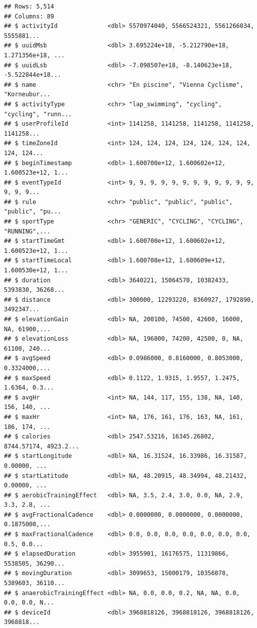 \documentclass[
]{book}
\begin{document}
\begin{verbatim}
## Rows: 5,514
## Columns: 89
## $ activityId              <dbl> 5570974040, 5566524321, 5561266034, 5555881...
## $ uuidMsb                 <dbl> 3.695224e+18, -5.212790e+18, 1.271356e+18, ...
## $ uuidLsb                 <dbl> -7.098507e+18, -8.140623e+18, -5.522844e+18...
## $ name                    <chr> "En piscine", "Vienna Cyclisme", "Korneubur...
## $ activityType            <chr> "lap_swimming", "cycling", "cycling", "runn...
## $ userProfileId           <int> 1141258, 1141258, 1141258, 1141258, 1141258...
## $ timeZoneId              <int> 124, 124, 124, 124, 124, 124, 124, 124, 124...
## $ beginTimestamp          <dbl> 1.600700e+12, 1.600602e+12, 1.600523e+12, 1...
## $ eventTypeId             <int> 9, 9, 9, 9, 9, 9, 9, 9, 9, 9, 9, 9, 9, 9, 9...
## $ rule                    <chr> "public", "public", "public", "public", "pu...
## $ sportType               <chr> "GENERIC", "CYCLING", "CYCLING", "RUNNING",...
## $ startTimeGmt            <dbl> 1.600700e+12, 1.600602e+12, 1.600523e+12, 1...
## $ startTimeLocal          <dbl> 1.600708e+12, 1.600609e+12, 1.600530e+12, 1...
## $ duration                <dbl> 3640221, 15064570, 10382433, 5393830, 36268...
## $ distance                <dbl> 300000, 12293220, 8360927, 1792890, 3492347...
## $ elevationGain           <dbl> NA, 200100, 74500, 42600, 16000, NA, 61900,...
## $ elevationLoss           <dbl> NA, 196800, 74200, 42500, 0, NA, 61100, 240...
## $ avgSpeed                <dbl> 0.0986000, 0.8160000, 0.8053000, 0.3324000,...
## $ maxSpeed                <dbl> 0.1122, 1.9315, 1.9557, 1.2475, 1.6364, 0.3...
## $ avgHr                   <int> NA, 144, 117, 155, 138, NA, 140, 156, 140, ...
## $ maxHr                   <int> NA, 176, 161, 176, 163, NA, 161, 186, 174, ...
## $ calories                <dbl> 2547.53216, 16345.26802, 8744.57174, 4923.2...
## $ startLongitude          <dbl> NA, 16.31524, 16.33986, 16.31587, 0.00000, ...
## $ startLatitude           <dbl> NA, 48.20915, 48.34994, 48.21432, 0.00000, ...
## $ aerobicTrainingEffect   <dbl> NA, 3.5, 2.4, 3.0, 0.0, NA, 2.9, 3.3, 2.8, ...
## $ avgFractionalCadence    <dbl> 0.0000000, 0.0000000, 0.0000000, 0.1875000,...
## $ maxFractionalCadence    <dbl> 0.0, 0.0, 0.0, 0.0, 0.0, 0.0, 0.0, 0.5, 0.0...
## $ elapsedDuration         <dbl> 3955901, 16176575, 11319866, 5538505, 36290...
## $ movingDuration          <dbl> 3099653, 15000179, 10356078, 5389603, 36110...
## $ anaerobicTrainingEffect <dbl> NA, 0.0, 0.0, 0.2, NA, NA, 0.0, 0.0, 0.0, N...
## $ deviceId                <dbl> 3968818126, 3968818126, 3968818126, 3968818...

\end{verbatim}
\end{document}

